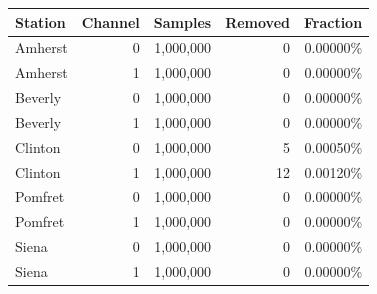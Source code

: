\begin{tabular}{lrrrr}
\toprule
Station & Channel & Samples & Removed & Fraction \\
\midrule
Amherst & 0 & 1,000,000 & 0 & 0.00000\% \\
Amherst & 1 & 1,000,000 & 0 & 0.00000\% \\
Beverly & 0 & 1,000,000 & 0 & 0.00000\% \\
Beverly & 1 & 1,000,000 & 0 & 0.00000\% \\
Clinton & 0 & 1,000,000 & 5 & 0.00050\% \\
Clinton & 1 & 1,000,000 & 12 & 0.00120\% \\
Pomfret & 0 & 1,000,000 & 0 & 0.00000\% \\
Pomfret & 1 & 1,000,000 & 0 & 0.00000\% \\
Siena & 0 & 1,000,000 & 0 & 0.00000\% \\
Siena & 1 & 1,000,000 & 0 & 0.00000\% \\
\bottomrule
\end{tabular}
